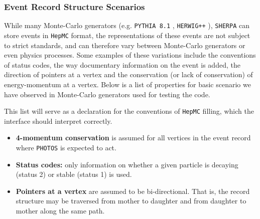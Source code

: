 \documentclass[]{Photos_interface_design}
\begin{document}
\subsubsection{Event Record Structure Scenarios}



While many Monte-Carlo generators (e.g. {\tt PYTHIA 8.1} \cite{Sjostrand:2007gs}, 
{\tt HERWIG++} \cite{Bahr:2008pv}), {\tt SHERPA} \cite{Gleisberg:2008ta} can 
store events in {\tt HepMC} format, the  representations of
these events are not subject to strict standards,  and can therefore
vary between Monte-Carlo generators or even physics processes. Some examples
of these variations include the conventions of status codes, the  way
documentary information on the event is added, the direction of pointers at a vertex
and the conservation (or lack of conservation) of energy-momentum at a vertex.
Below is a list of properties for basic scenario we have observed in Monte-Carlo
generators used for testing the code.

This list will serve as a declaration for the conventions of  {\tt HepMC} filling, which  the 
interface should interpret correctly.

\begin{itemize}
  \item \textbf{4-momentum conservation} is assumed for all vertices in the event record where {\tt PHOTOS} is expected to act.
  \item \textbf{Status codes:} only information on whether a given particle is decaying (status 2) or stable (status 1) is used.
  \item \textbf{Pointers at a vertex} are assumed to be bi-directional. 
    That is, the record structure may be traversed from mother to daughter 
    and from daughter to mother along the same path.
\end{itemize}
\end{document}
